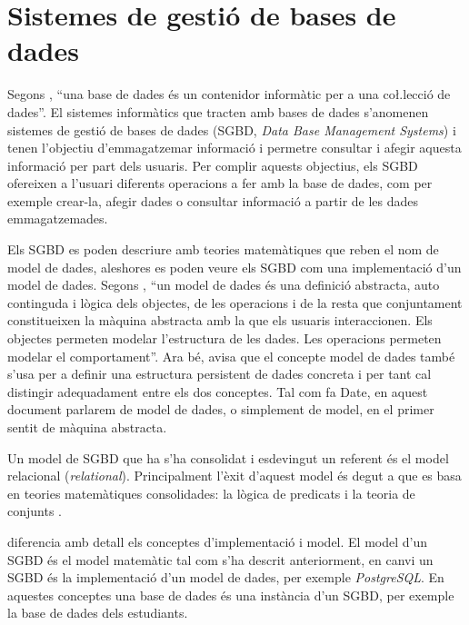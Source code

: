 \section{Sistemes de gestió de bases de dades}
\label{sec:art:sgbd}


Segons \textcite{date:introduction}, ``una base de dades és un
contenidor informàtic per a una co\l.lecció de dades''. El sistemes
informàtics que tracten amb bases de dades s'anomenen sistemes de
gestió de bases de dades (SGBD, \emph{Data Base Management Systems}) i
tenen l'objectiu d'emmagatzemar informació i permetre consultar i
afegir aquesta informació per part dels usuaris.  Per complir aquests
objectius, els SGBD ofereixen a l'usuari diferents operacions a fer
amb la base de dades, com per exemple crear-la, afegir dades o
consultar informació a partir de les dades emmagatzemades.

Els SGBD es poden descriure amb teories matemàtiques que reben el nom
de model de dades, aleshores es poden veure els SGBD com una
implementació d'un model de dades.  Segons
\citeauthor{date:introduction}, ``un model de dades és una definició
abstracta, auto continguda i lògica dels objectes, de les operacions i
de la resta que conjuntament constitueixen la màquina abstracta amb la
que els usuaris interaccionen. Els objectes permeten modelar
l'estructura de les dades. Les operacions permeten modelar el
comportament''. Ara bé, \citeauthor{date:introduction} avisa que el
concepte model de dades també s'usa per a definir una estructura
persistent de dades concreta i per tant cal distingir adequadament
entre els dos conceptes.  Tal com fa Date, en aquest document parlarem
de model de dades, o simplement de model, en el primer sentit de
màquina abstracta.


Un model de SGBD que ha s'ha consolidat i esdevingut un referent és el
model relacional (\emph{relational}). Principalment l'èxit d'aquest
model és degut a que es basa en teories matemàtiques consolidades: la
lògica de predicats i la teoria de
conjunts \parencite{date:introduction}.



\textcite{date:introduction} diferencia amb detall els conceptes
d'implementació i model.  El model d'un SGBD és el model matemàtic tal
com s'ha descrit anteriorment, en canvi un SGBD és la implementació
d'un model de dades, per exemple \emph{PostgreSQL}.
En aquestes conceptes una base de dades és una instància d'un SGBD, per exemple la base de dades dels estudiants.


